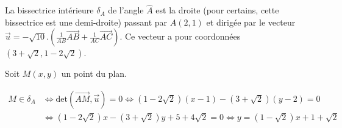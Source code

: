 {\begin{enumerate}
{La bissectrice intérieure $\delta_A$ de l'angle $\widehat{A}$ est la droite (pour certains, cette bissectrice est une demi-droite) passant par $A(2,1)$ et dirigée par le vecteur $\vec{u}=-\sqrt{10}.(\frac{1}{AB}\overrightarrow{AB}+\frac{1}{AC}\overrightarrow{AC})$. Ce vecteur a pour coordonnées $(3+\sqrt{2},1-2\sqrt{2})$.

Soit $M(x,y)$ un point du plan.

\begin{align*}
M\in\delta_A&\Leftrightarrow\mbox{det}(\overrightarrow{AM},\vec{u})=0\Leftrightarrow(1-2\sqrt{2})(x-1)-(3+\sqrt{2})(y-2)=0\\
 &\Leftrightarrow(1-2\sqrt{2})x-(3+\sqrt{2})y+5+4\sqrt{2}=0\Leftrightarrow y=(1-\sqrt{2})x+1+\sqrt{2}
\end{align*}}
\end{enumerate}
}